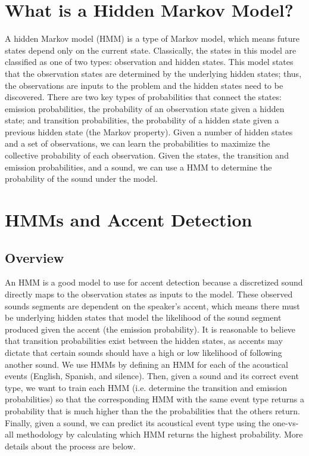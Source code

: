 \documentclass{wileySev}
\begin{document}
\section{What is a Hidden Markov Model?}
A hidden Markov model (HMM) is a type of Markov model, which means future states depend only on the current state. Classically, the states in this model are classified as one of two types: observation and hidden states. This model states that the observation states are determined by the underlying hidden states; thus, the observations are inputs to the problem and the hidden states need to be discovered. There are two key types of probabilities that connect the states: emission probabilities, the probability of an observation state given a hidden state; and transition probabilities, the probability of a hidden state given a previous hidden state (the Markov property). Given a number of hidden states and a set of observations, we can learn the probabilities to maximize the collective probability of each observation. Given the states, the transition and emission probabilities, and a sound, we can use a HMM to determine the probability of the sound under the model.

\section{HMMs and Accent Detection}
\subsection{Overview}
An HMM is a good model to use for accent detection because a discretized sound directly maps to the observation states as inputs to the model. These observed sounds segments are dependent on the speaker's accent, which means there must be underlying hidden states that model the likelihood of the sound segment produced given the accent (the emission probability). It is reasonable to believe that transition probabilities exist between the hidden states, as accents may dictate that certain sounds should have a high or low likelihood of following another sound. We use HMMs by defining an HMM for each of the acoustical events (English, Spanish, and silence). Then, given a sound and its correct event type, we want to train each HMM (i.e. determine the transition and emission probabilities) so that the corresponding HMM with the same event type returns a probability that is much higher than the the probabilities that the others return. Finally, given a sound, we can predict its acoustical event type using the one-vs-all methodology by calculating which HMM returns the highest probability. More details about the process are below.
\end{document}

